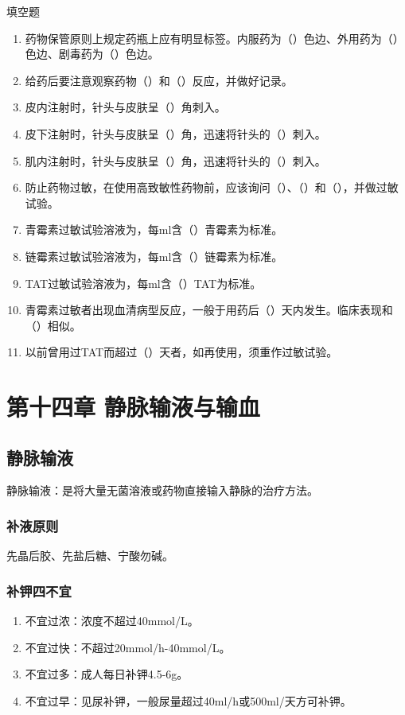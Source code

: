 \documentclass[11pt, a4paper]{ctexart}
\begin{document}
\begin{tipsbox}{填空题}
	\begin{enumerate}
		\item 药物保管原则上规定药瓶上应有明显标签。内服药为（\qquad）色边、外用药为（\qquad）色边、剧毒药为（\qquad）色边。
		\item 给药后要注意观察药物（\qquad）和（\qquad）反应，并做好记录。
		\item 皮内注射时，针头与皮肤呈（\qquad）角刺入。
		\item 皮下注射时，针头与皮肤呈（\qquad）角，迅速将针头的（\qquad）刺入。
		\item 肌内注射时，针头与皮肤呈（\qquad）角，迅速将针头的（\qquad）刺入。
		\item 防止药物过敏，在使用高致敏性药物前，应该询问（\qquad）、（\qquad）和（\qquad），并做过敏试验。
		\item 青霉素过敏试验溶液为，每ml含（\qquad）青霉素为标准。
		\item 链霉素过敏试验溶液为，每ml含（\qquad）链霉素为标准。
		\item TAT过敏试验溶液为，每ml含（\qquad）TAT为标准。
		\item 青霉素过敏者出现血清病型反应，一般于用药后（\qquad）天内发生。临床表现和（\qquad）相似。
		\item 以前曾用过TAT而超过（\qquad）天者，如再使用，须重作过敏试验。
	\end{enumerate}
\end{tipsbox}

\section{第十四章 静脉输液与输血}
\subsection{静脉输液}
静脉输液：是将大量无菌溶液或药物直接输入静脉的治疗方法。

\subsubsection{补液原则}
先晶后胶、先盐后糖、宁酸勿碱。

\subsubsection{补钾四不宜}
\begin{enumerate}
	\item 不宜过浓：浓度不超过40mmol/L。
	\item 不宜过快：不超过20mmol/h-40mmol/L。
	\item 不宜过多：成人每日补钾4.5-6g。
	\item 不宜过早：见尿补钾，一般尿量超过40ml/h或500ml/天方可补钾。
\end{enumerate}
\end{document}
